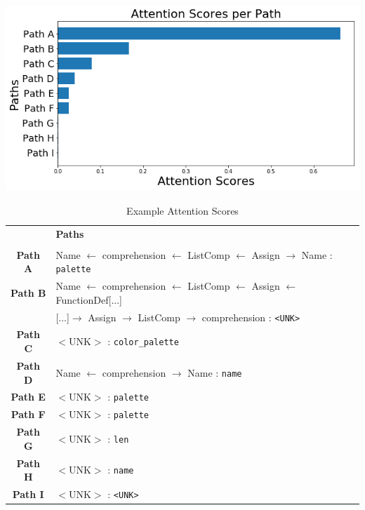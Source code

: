 



\begingroup
\begin{table}
\begin{center}
\includegraphics[width=0.8\linewidth]{ImagesCodeRelated/attention_xkcd.png}
    \fontsize{10pt}{12pt}\selectfont
\begin{tabular}{c l}
    & \textbf{Paths} \\
    \\
    \textbf{Path A} & Name $\leftarrow$ comprehension $\leftarrow$ ListComp $\leftarrow$ Assign $\rightarrow$ Name : \texttt{palette} \\
    \textbf{Path B} & Name $\leftarrow$ comprehension $\leftarrow$ ListComp $\leftarrow$ Assign $\leftarrow$ FunctionDef[...] \\
        & [...]$\rightarrow$ Assign $\rightarrow$ ListComp $\rightarrow$ comprehension : \texttt{<UNK>} \\
    \textbf{Path C} & $<$UNK$>$ : \texttt{color_palette} \\
    \textbf{Path D} & Name $\leftarrow$ comprehension $\rightarrow$ Name : \texttt{name} \\
    \textbf{Path E} & $<$UNK$>$ : \texttt{palette} \\
    \textbf{Path F} & $<$UNK$>$ : \texttt{palette} \\
    \textbf{Path G} & $<$UNK$>$ : \texttt{len} \\
    \textbf{Path H} & $<$UNK$>$ : \texttt{name} \\
    \textbf{Path I} & $<$UNK$>$ : \texttt{<UNK>} \\
\end{tabular}
\end{center}

\caption{Example Attention Scores}
\end{table}
\endgroup

